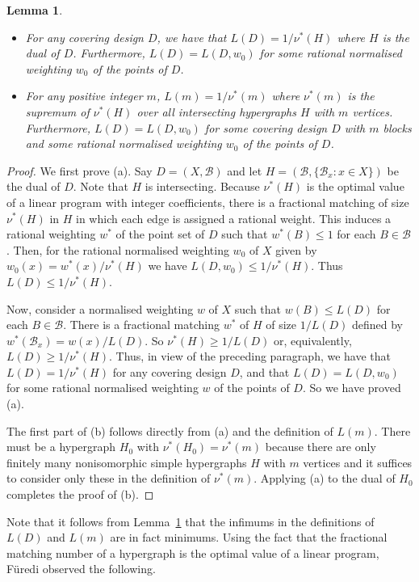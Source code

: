 \documentclass[11pt]{article}
\newtheorem{Lemma}[Theorem]{Lemma}
\theoremstyle{definition}
\renewcommand{\leq}{\leqslant}
\renewcommand{\geq}{\geqslant}
\newcommand{\B}{{\ensuremath{\mathcal{B}}}}
\begin{document}
\begin{Lemma}\label{L:LVsFracIndepSet}\phantom{a}
\begin{itemize}
    \item[\textup{(a)}]
For any covering design $D$, we have that $L(D)=1/\nu^*(H)$ where $H$ is the dual of $D$. Furthermore, $L(D)=L(D,w_0)$ for some rational normalised weighting $w_0$ of the points of $D$.
    \item[\textup{(b)}]
For any positive integer $m$, $L(m)=1/\nu^*(m)$ where $\nu^*(m)$ is the supremum of $\nu^*(H)$ over all intersecting hypergraphs $H$ with $m$ vertices. Furthermore, $L(D)=L(D,w_0)$ for some covering design $D$ with $m$ blocks and some rational normalised weighting $w_0$ of the points of $D$.
\end{itemize}
\end{Lemma}

\begin{proof}
We first prove (a). Say $D=(X,\B)$ and let $H=(\B,\{\B_x : x \in X\})$ be the dual of $D$. Note that $H$ is intersecting. Because $\nu^*(H)$ is the optimal value of a linear program with integer coefficients, there is a fractional matching of size $\nu^*(H)$ in $H$ in which each edge is assigned a rational weight. This induces a rational weighting $w^*$ of the point set of $D$ such that $w^*(B) \leq 1$ for each $B \in \B$. Then, for the rational normalised weighting $w_0$ of $X$ given by $w_0(x)=w^*(x)/\nu^*(H)$ we have $L(D,w_0) \leq 1/\nu^*(H)$. Thus $L(D) \leq 1/\nu^*(H)$.

Now, consider a normalised weighting $w$ of $X$ such that $w(B) \leq L(D)$ for each $B \in \B$. There is a fractional matching $w^*$ of $H$ of size $1/L(D)$ defined by $w^*(\B_x)=w(x)/L(D)$. So $\nu^*(H)\geq 1/L(D)$ or, equivalently, $L(D) \geq 1/\nu^*(H)$. Thus, in view of the preceding paragraph, we have that $L(D)=1/\nu^*(H)$ for any covering design $D$, and that $L(D)=L(D,w_0)$ for some rational normalised weighting $w$ of the points of $D$. So we have proved (a).

The first part of (b) follows directly from (a) and the definition of $L(m)$. There must be a hypergraph $H_0$ with $\nu^*(H_0)=\nu^*(m)$ because there are only finitely many nonisomorphic simple hypergraphs $H$ with $m$ vertices and it suffices to consider only these in the definition of $\nu^*(m)$. Applying (a) to the dual of $H_0$ completes the proof of (b).
\end{proof}

Note that it follows from Lemma~\ref{L:LVsFracIndepSet} that the infimums in the definitions of $L(D)$ and $L(m)$ are in fact minimums. Using the fact that the fractional matching number of a hypergraph is the optimal value of a linear program, F{\"u}redi \cite{Fur} observed the following.
\end{document}
